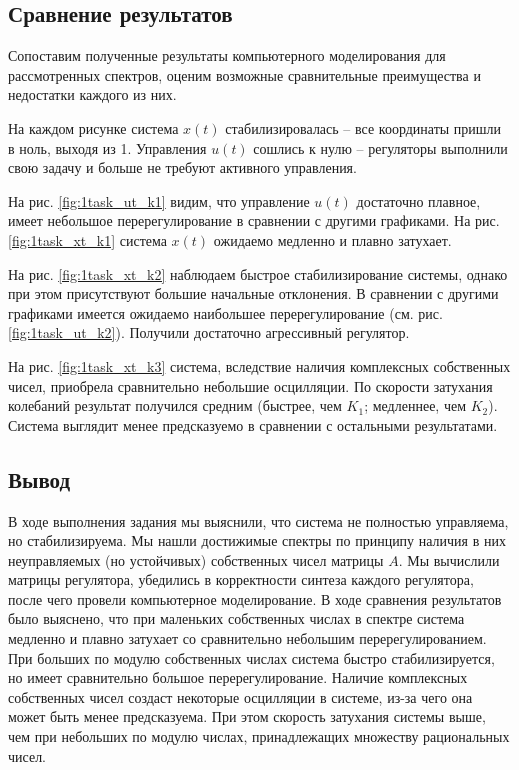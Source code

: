 \documentclass[a4paper, 12pt]{article}
\begin{document}
    \subsection{Сравнение результатов}
    Сопоставим полученные результаты компьютерного моделирования для рассмотренных спектров,
    оценим возможные сравнительные преимущества и недостатки каждого из них.


    На каждом рисунке система $x(t)$ стабилизировалась -- все координаты пришли в ноль, выходя из 1.
    Управления $u(t)$ сошлись к нулю -- регуляторы выполнили свою задачу и больше не требуют
    активного управления.
    

    На рис. \ref{fig:1task_ut_k1} видим, что управление $u(t)$ достаточно плавное,
    имеет небольшое перерегулирование в сравнении с другими графиками.
    На рис. \ref{fig:1task_xt_k1} система $x(t)$ ожидаемо медленно и плавно затухает.


    На рис. \ref{fig:1task_xt_k2} наблюдаем быстрое стабилизирование системы, однако при
    этом присутствуют большие начальные отклонения. В сравнении с другими графиками имеется
    ожидаемо наибольшее перерегулирование (см. рис. \ref{fig:1task_ut_k2}).
    Получили достаточно агрессивный регулятор.


    На рис. \ref{fig:1task_xt_k3} система, вследствие наличия комплексных собственных чисел,
    приобрела сравнительно небольшие осцилляции. По скорости затухания колебаний результат получился средним
    (быстрее, чем $K_1$; медленнее, чем $K_2$). Система выглядит менее предсказуемо в сравнении с остальными результатами.


    \subsection{Вывод}
    В ходе выполнения задания мы выяснили, что система не полностью управляема, но стабилизируема.
    Мы нашли достижимые спектры по принципу наличия в них неуправляемых (но устойчивых) собственных чисел
    матрицы $A$. Мы вычислили матрицы регулятора, убедились в корректности синтеза каждого регулятора, после чего
    провели компьютерное моделирование. В ходе сравнения результатов было выяснено, что при маленьких собственных
    числах в спектре система медленно и плавно затухает со сравнительно небольшим перерегулированием. При больших
    по модулю собственных числах система быстро стабилизируется, но имеет сравнительно большое перерегулирование.
    Наличие комплексных собственных чисел создаст некоторые осцилляции в системе, из-за чего она может быть менее
    предсказуема. При этом скорость затухания системы выше, чем при небольших по модулю числах, принадлежащих множеству рациональных чисел.
\end{document}
